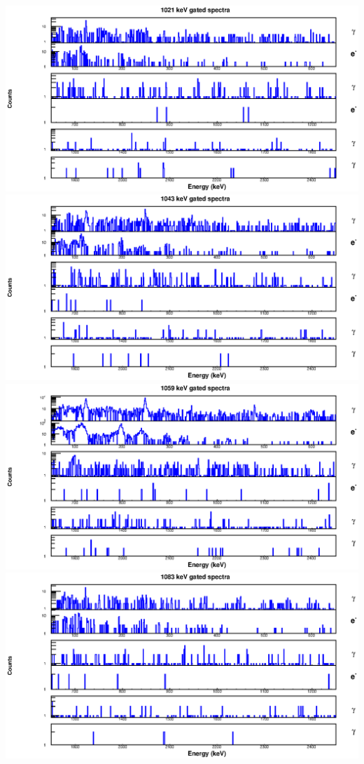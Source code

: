 \begin{landscape}
\includegraphics[scale=1.2]{154Gd_Appendix/1021_combined.eps}
\includegraphics[scale=1.2]{154Gd_Appendix/1043_combined.eps}
\includegraphics[scale=1.2]{154Gd_Appendix/1059_combined.eps}
\includegraphics[scale=1.2]{154Gd_Appendix/1083_combined.eps}

\end{landscape}
